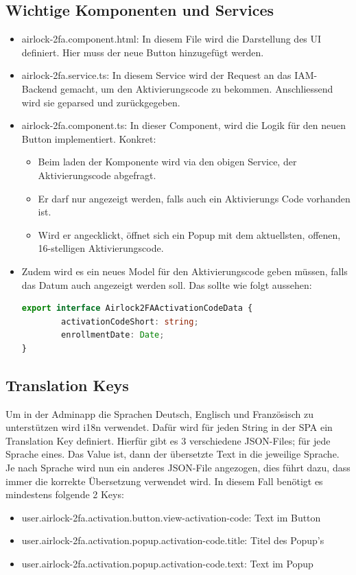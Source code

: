 \subsection{Wichtige Komponenten und Services}
\begin{itemize}
	\item airlock-2fa.component.html: In diesem File wird die Darstellung des UI definiert. Hier muss der neue Button hinzugefügt werden.
	\item airlock-2fa.service.ts: In diesem Service wird der Request an das IAM-Backend gemacht, um den Aktivierungscode zu bekommen. Anschliessend wird sie geparsed und zurückgegeben.
	\item airlock-2fa.component.ts: In dieser Component, wird die Logik für den neuen Button implementiert. Konkret:
	\begin{itemize}
		\item Beim laden der Komponente wird via den obigen Service, der Aktivierungscode abgefragt.  
		\item Er darf nur angezeigt werden, falls auch ein Aktivierungs Code vorhanden ist.
		\item Wird er angecklickt, öffnet sich ein Popup mit dem aktuellsten, offenen, 16-stelligen Aktivierungscode.
	\end{itemize}
	\item Zudem wird es ein neues Model für den Aktivierungscode geben müssen, falls das Datum auch angezeigt werden soll. Das sollte wie folgt aussehen:
		\begin{lstlisting}[language=TypeScript]
export interface Airlock2FAActivationCodeData {
		activationCodeShort: string;
		enrollmentDate: Date;
}
		\end{lstlisting}
\end{itemize}
\subsection{Translation Keys}
Um in der Adminapp die Sprachen Deutsch, Englisch und Französisch zu unterstützen wird i18n verwendet. Dafür wird für jeden String in der SPA ein Translation Key definiert. Hierfür gibt es 3 verschiedene JSON-Files; für jede Sprache eines. Das Value ist, dann der übersetzte Text in die jeweilige Sprache. Je nach Sprache wird nun ein anderes JSON-File angezogen, dies führt dazu, dass immer die korrekte Übersetzung verwendet wird. In diesem Fall benötigt es mindestens folgende 2 Keys:
\begin{itemize}
	\item user.airlock-2fa.activation.button.view-activation-code: Text im Button
	\item user.airlock-2fa.activation.popup.activation-code.title: Titel des Popup's
	\item user.airlock-2fa.activation.popup.activation-code.text: Text im Popup
\end{itemize}

